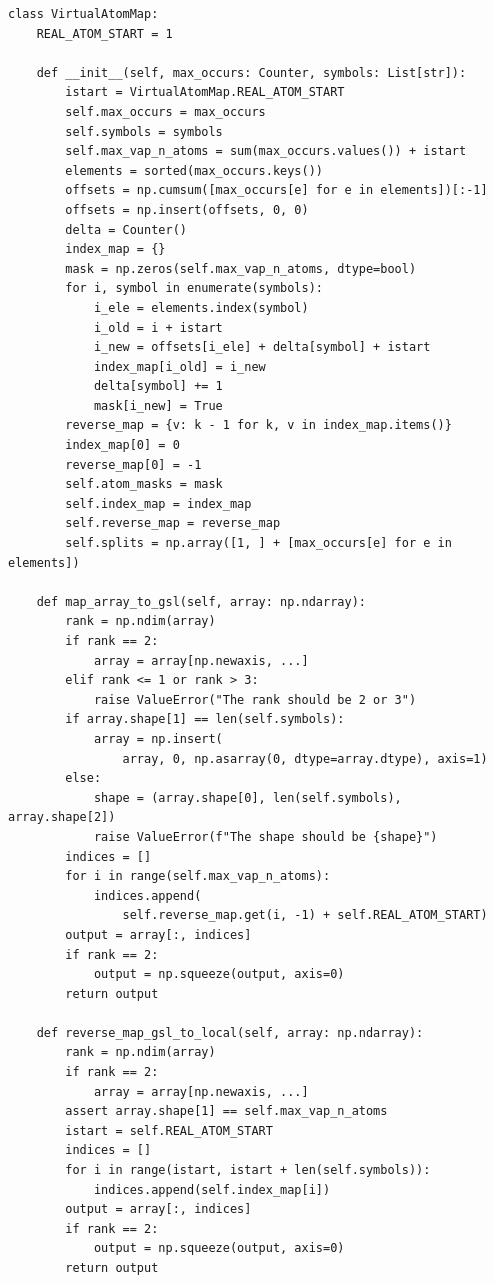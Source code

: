 \documentclass[preprint]{revtex4-2}
\begin{document}
\begin{verbatim}
class VirtualAtomMap:
    REAL_ATOM_START = 1

    def __init__(self, max_occurs: Counter, symbols: List[str]):
        istart = VirtualAtomMap.REAL_ATOM_START
        self.max_occurs = max_occurs
        self.symbols = symbols
        self.max_vap_n_atoms = sum(max_occurs.values()) + istart
        elements = sorted(max_occurs.keys())
        offsets = np.cumsum([max_occurs[e] for e in elements])[:-1]
        offsets = np.insert(offsets, 0, 0)
        delta = Counter()
        index_map = {}
        mask = np.zeros(self.max_vap_n_atoms, dtype=bool)
        for i, symbol in enumerate(symbols):
            i_ele = elements.index(symbol)
            i_old = i + istart
            i_new = offsets[i_ele] + delta[symbol] + istart
            index_map[i_old] = i_new
            delta[symbol] += 1
            mask[i_new] = True
        reverse_map = {v: k - 1 for k, v in index_map.items()}
        index_map[0] = 0
        reverse_map[0] = -1
        self.atom_masks = mask
        self.index_map = index_map
        self.reverse_map = reverse_map
        self.splits = np.array([1, ] + [max_occurs[e] for e in elements])

    def map_array_to_gsl(self, array: np.ndarray):
        rank = np.ndim(array)
        if rank == 2:
            array = array[np.newaxis, ...]
        elif rank <= 1 or rank > 3:
            raise ValueError("The rank should be 2 or 3")
        if array.shape[1] == len(self.symbols):
            array = np.insert(
                array, 0, np.asarray(0, dtype=array.dtype), axis=1)
        else:
            shape = (array.shape[0], len(self.symbols), array.shape[2])
            raise ValueError(f"The shape should be {shape}")
        indices = []
        for i in range(self.max_vap_n_atoms):
            indices.append(
                self.reverse_map.get(i, -1) + self.REAL_ATOM_START)
        output = array[:, indices]
        if rank == 2:
            output = np.squeeze(output, axis=0)
        return output

    def reverse_map_gsl_to_local(self, array: np.ndarray):
        rank = np.ndim(array)
        if rank == 2:
            array = array[np.newaxis, ...]
        assert array.shape[1] == self.max_vap_n_atoms
        istart = self.REAL_ATOM_START
        indices = []
        for i in range(istart, istart + len(self.symbols)):
            indices.append(self.index_map[i])
        output = array[:, indices]
        if rank == 2:
            output = np.squeeze(output, axis=0)
        return output
\end{verbatim}
\end{document}
